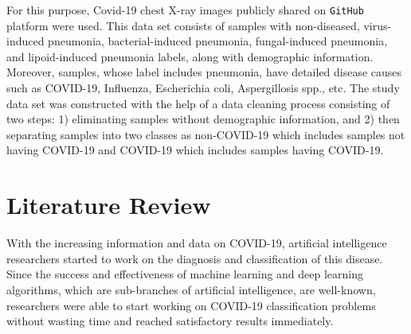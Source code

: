 
For this purpose, Covid-19 chest X-ray images publicly shared on \texttt{GitHub} platform were used. This data set consists of samples with non-diseased, virus-induced pneumonia, bacterial-induced pneumonia, fungal-induced pneumonia, and lipoid-induced pneumonia labels, along with demographic information. Moreover, samples, whose label includes pneumonia, have detailed disease causes such as COVID-19, Influenza, Escherichia coli, Aspergillosis spp., etc. The study data set was constructed with the help of a data cleaning process consisting of two steps: 1) eliminating samples without demographic information, and 2) then separating samples into two classes as non-COVID-19 which includes samples not having COVID-19 and COVID-19 which includes samples having COVID-19.



\section{Literature Review}\label{literaturereview}

With the increasing information and data on COVID-19, artificial intelligence researchers started to work on the diagnosis and classification of this disease. Since the success and effectiveness of machine learning and deep learning algorithms, which are sub-branches of artificial intelligence, are well-known, researchers were able to start working on COVID-19 classification problems without wasting time and reached satisfactory results immediately.

